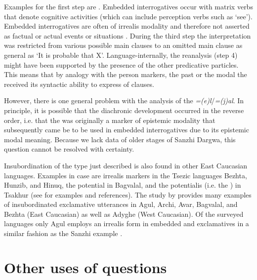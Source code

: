 Examples for the first step are . Embedded interrogatives occur with matrix verbs that denote cognitive activities (which can include perception verbs such as ‘see'). Embedded interrogatives are often of irrealis modality and therefore not asserted as factual or actual events or situations . During the third step the interpretation was restricted from various possible main clauses to an omitted main clause as general as ‘It is probable that X'. Language-internally, the reanalysis (step 4) might have been supported by the presence of the other predicative particles. This means that by analogy with the person markers, the past  or the modal  the  received its syntactic ability to express  of clauses.

However, there is one general problem with the  analysis of the  \textit{=(e)l}\slash\textit{=(j)al}. In principle, it is possible that the diachronic development occurred in the reverse order, i.e. that the  was originally a marker of epistemic modality that subsequently came be to be used in embedded interrogatives due to its epistemic modal meaning. Because we lack data of older stages of Sanzhi Dargwa, this question cannot be resolved with certainty.

Insubordination of the type just described is also found in other East Caucasian languages. Examples in case are irrealis markers in the Tsezic languages Bezhta, Hunzib, and Hinuq, the potential  in Bagvalal, and the potentialis (i.e. the ) in Tsakhur (see \citet{ComrieForkerKhalilova2016} for examples and references). The study by \citet{Kalinina2011} provides many examples of insubordinated exclamative utterances in Agul, Archi, Avar, Bagvalal, and Bezhta (East Caucasian) as well as Adyghe (West Caucasian). Of the surveyed languages only Agul employs an irrealis  form in embedded  and exclamatives in a similar fashion as the Sanzhi example .


\section{Other uses of questions}
\label{sec:Other uses of questions}

